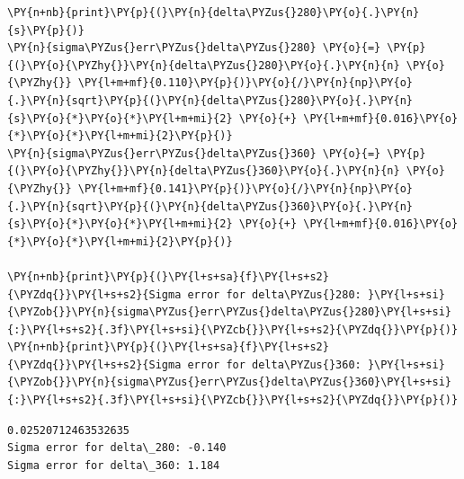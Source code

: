     \begin{tcolorbox}[breakable, size=fbox, boxrule=1pt, pad at break*=1mm,colback=cellbackground, colframe=cellborder]
\begin{Verbatim}[commandchars=\\\{\}]
\PY{n+nb}{print}\PY{p}{(}\PY{n}{delta\PYZus{}280}\PY{o}{.}\PY{n}{s}\PY{p}{)}
\PY{n}{sigma\PYZus{}err\PYZus{}delta\PYZus{}280} \PY{o}{=} \PY{p}{(}\PY{o}{\PYZhy{}}\PY{n}{delta\PYZus{}280}\PY{o}{.}\PY{n}{n} \PY{o}{\PYZhy{}} \PY{l+m+mf}{0.110}\PY{p}{)}\PY{o}{/}\PY{n}{np}\PY{o}{.}\PY{n}{sqrt}\PY{p}{(}\PY{n}{delta\PYZus{}280}\PY{o}{.}\PY{n}{s}\PY{o}{*}\PY{o}{*}\PY{l+m+mi}{2} \PY{o}{+} \PY{l+m+mf}{0.016}\PY{o}{*}\PY{o}{*}\PY{l+m+mi}{2}\PY{p}{)}
\PY{n}{sigma\PYZus{}err\PYZus{}delta\PYZus{}360} \PY{o}{=} \PY{p}{(}\PY{o}{\PYZhy{}}\PY{n}{delta\PYZus{}360}\PY{o}{.}\PY{n}{n} \PY{o}{\PYZhy{}} \PY{l+m+mf}{0.141}\PY{p}{)}\PY{o}{/}\PY{n}{np}\PY{o}{.}\PY{n}{sqrt}\PY{p}{(}\PY{n}{delta\PYZus{}360}\PY{o}{.}\PY{n}{s}\PY{o}{*}\PY{o}{*}\PY{l+m+mi}{2} \PY{o}{+} \PY{l+m+mf}{0.016}\PY{o}{*}\PY{o}{*}\PY{l+m+mi}{2}\PY{p}{)}

\PY{n+nb}{print}\PY{p}{(}\PY{l+s+sa}{f}\PY{l+s+s2}{\PYZdq{}}\PY{l+s+s2}{Sigma error for delta\PYZus{}280: }\PY{l+s+si}{\PYZob{}}\PY{n}{sigma\PYZus{}err\PYZus{}delta\PYZus{}280}\PY{l+s+si}{:}\PY{l+s+s2}{.3f}\PY{l+s+si}{\PYZcb{}}\PY{l+s+s2}{\PYZdq{}}\PY{p}{)}
\PY{n+nb}{print}\PY{p}{(}\PY{l+s+sa}{f}\PY{l+s+s2}{\PYZdq{}}\PY{l+s+s2}{Sigma error for delta\PYZus{}360: }\PY{l+s+si}{\PYZob{}}\PY{n}{sigma\PYZus{}err\PYZus{}delta\PYZus{}360}\PY{l+s+si}{:}\PY{l+s+s2}{.3f}\PY{l+s+si}{\PYZcb{}}\PY{l+s+s2}{\PYZdq{}}\PY{p}{)}
\end{Verbatim}
\end{tcolorbox}

    \begin{Verbatim}[commandchars=\\\{\}]
0.02520712463532635
Sigma error for delta\_280: -0.140
Sigma error for delta\_360: 1.184
    \end{Verbatim}

    \begin{tcolorbox}[breakable, size=fbox, boxrule=1pt, pad at break*=1mm,colback=cellbackground, colframe=cellborder]
\begin{Verbatim}[commandchars=\\\{\}]

\end{Verbatim}
\end{tcolorbox}

